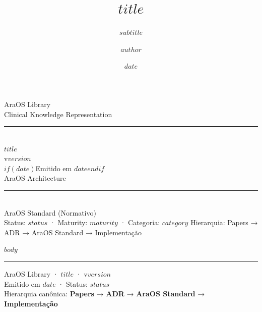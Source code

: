 \documentclass[11pt,a4paper]{article}
\title{$title$}
\subtitle{$subtitle$}
\author{$author$}
\date{$date$}
\begin{document}
\begin{titlepage}
\centering
\vspace*{2cm}
{\Huge\color{araosaccent}\textsf{AraOS Library}}\\[1em]
{\large\color{araosaccent}\textsf{Clinical Knowledge Representation}}\\[3em]
\rule{\textwidth}{1pt}\\[1em]
{\Huge\bfseries $title$}\\[1em]
{\Large\color{araosaccent}v$version$}\\[3em]
{\large $if(date)$Emitido em $date$$endif$}\\[0.5em]
{\large AraOS Architecture}\\[1em]
\rule{\textwidth}{0.5pt}\\[1em]
{\small\color{araosaccent}\textsf{AraOS Standard (Normativo)}}\\
{\small\color{araosrule}\textsf{Status: $status$ · Maturity: $maturity$ · Categoria: $category$}}
\vfill
{\small\color{araosrule}Hierarquia: Papers → ADR → AraOS Standard → Implementação}
\end{titlepage}

\tableofcontents
\newpage

$body$

\vfill
\hrule
\vspace{0.5em}
\begin{center}
\small\color{araosrule}
AraOS Library · $title$ · v$version$\\[0.3em]
Emitido em $date$ · Status: $status$\\[0.3em]
Hierarquia canônica: \textbf{Papers} → \textbf{ADR} → \textbf{AraOS Standard} → \textbf{Implementação}
\end{center}
\end{document}
